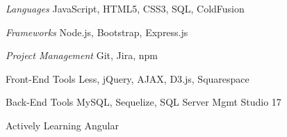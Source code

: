 \begin{minipage}[t]{0.5\textwidth}
\begin{cvskills}

  \cvskill
    {\textit{Languages}} %
    {JavaScript, HTML5, CSS3, SQL, ColdFusion} %


  \cvskill
    {\textit{Frameworks}} %
    {Node.js, Bootstrap, Express.js} %


  \cvskill
    {\textit{Project Management}} %
    {Git, Jira, npm} %

 
\end{cvskills}
\end{minipage}%
\begin{minipage}[t]{0.5\textwidth}
\begin{cvskills}

 \cvskill
    {Front-End Tools} %
    {Less, jQuery, AJAX, D3.js, Squarespace} %


  \cvskill
    {Back-End Tools} %
    {MySQL, Sequelize, SQL Server Mgmt Studio 17} %


  \cvskill
    {Actively Learning} %
    {Angular} %

\end{cvskills}
\end{minipage}

%
